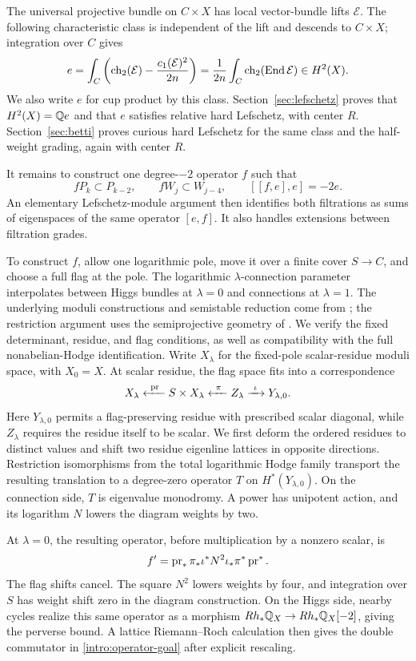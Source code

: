 The universal projective bundle on $C\times X$ has local vector-bundle lifts $\mathcal E$. The following characteristic class is independent of the lift and descends to $C\times X$; integration over $C$ gives
\[
e=\int_C\left(\operatorname{ch}_2(\mathcal E)-\frac{c_1(\mathcal E)^2}{2n}\right)
=\frac1{2n}\int_C\operatorname{ch}_2(\operatorname{End}\mathcal E)\in H^2(X).
\]
We also write $e$ for cup product by this class. Section~\ref{sec:lefschetz} proves that $H^2(X)=\mathbb Q e$ and that $e$ satisfies relative hard Lefschetz, with center $R$. Section~\ref{sec:betti} proves curious hard Lefschetz for the same class and the half-weight grading, again with center $R$.

It remains to construct one degree-$-2$ operator $f$ such that
\begin{equation}\label{intro:operator-goal}
fP_k\subset P_{k-2},\qquad
fW_j\subset W_{j-4},\qquad [[f,e],e]=-2e.
\end{equation}
An elementary Lefschetz-module argument then identifies both filtrations as sums of eigenspaces of the same operator $[e,f]$. It also handles extensions between filtration grades.

To construct $f$, allow one logarithmic pole, move it over a finite cover $S\to C$, and choose a full flag at the pole. The logarithmic $\lambda$-connection parameter interpolates between Higgs bundles at $\lambda=0$ and connections at $\lambda=1$. The underlying moduli constructions and semistable reduction come from \cite{dCFHLogHodge,FHZ2025}; the restriction argument uses the semiprojective geometry of \cite{HRV2015}. We verify the fixed determinant, residue, and flag conditions, as well as compatibility with the full nonabelian-Hodge identification. Write $X_\lambda$ for the fixed-pole scalar-residue moduli space, with $X_0=X$. At scalar residue, the flag space fits into a correspondence
\[
X_\lambda\xleftarrow{\ \operatorname{pr}\ }S\times X_\lambda
\xleftarrow{\ \pi\ }Z_\lambda
\xrightarrow{\ \iota\ }Y_{\lambda,0}.
\]
Here $Y_{\lambda,0}$ permits a flag-preserving residue with prescribed scalar diagonal, while $Z_\lambda$ requires the residue itself to be scalar. We first deform the ordered residues to distinct values and shift two residue eigenline lattices in opposite directions. Restriction isomorphisms from the total logarithmic Hodge family transport the resulting translation to a degree-zero operator $T$ on $H^*(Y_{\lambda,0})$. On the connection side, $T$ is eigenvalue monodromy. A power has unipotent action, and its logarithm $N$ lowers the diagram weights by two.

At $\lambda=0$, the resulting operator, before multiplication by a nonzero scalar, is
\[
f'=\operatorname{pr}_*\pi_*\iota^*N^2\iota_*\pi^*\operatorname{pr}^*.
\]
The flag shifts cancel. The square $N^2$ lowers weights by four, and integration over $S$ has weight shift zero in the diagram construction. On the Higgs side, nearby cycles realize this same operator as a morphism
$Rh_*\mathbb Q_X\to Rh_*\mathbb Q_X[-2]$, giving the perverse bound. A lattice Riemann--Roch calculation then gives the double commutator in \eqref{intro:operator-goal} after explicit rescaling.

